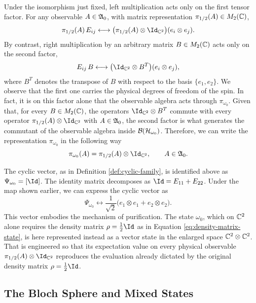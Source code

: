  	Under the isomorphism just fixed, left multiplication acts only on the first tensor factor. For any observable $A \in \mathfrak{A}_0$, with matrix representation $\pi_{1/2}(A) \in M_2(\mathbb{C})$,
 	\begin{equation}
 		\pi_{1/2}(A)\,E_{ij} \longleftrightarrow \big(\pi_{1/2}(A) \otimes \Id_{\C^2}\big)(e_i \otimes e_j).
 	\end{equation}
 	By contrast, right multiplication by an arbitrary matrix $B \in M_2(\mathbb{C})$ acts only on the second factor,
 	\begin{equation}
 		E_{ij}\,B \longleftrightarrow \big(\Id_{\C^2} \otimes B^T\big)(e_i \otimes e_j),
 	\end{equation}
 	where $B^T$ denotes the transpose of $B$ with respect to the basis $\{e_1,e_2\}$. We observe that the first one carries the physical degrees of freedom of the spin. In fact, it is on this factor alone that the observable algebra acts through $\pi_{\omega_0}$.  Given that, for every $B \in M_2(\mathbb{C})$, the operators $\Id_{\C^2} \otimes B^T$ commute with every operator $\pi_{1/2}(A) \otimes \Id_{\C^2}$ with $A \in \mathfrak{A}_0$, the second factor is what generates the commutant of the observable algebra inside $\mathcal{B}(\H_{\omega_0})$. Therefore, we can write the representation $\pi_{\omega_0}$ in the following way
 	\begin{equation}
 		\pi_{\omega_0}(A) = \pi_{1/2}(A) \otimes \Id_{\C^2}, \qquad A \in \A_0.
 	\end{equation}
 	
 	The cyclic vector, as in Definition \ref{def:cyclic-family}, is identified above as $\Psi_{\omega_0} = [\Id]$. The identity matrix decomposes as $\Id = E_{11}+E_{22}$. Under the map shown earlier, we can express the cyclic vector as
 	\begin{equation}
 		\Psi_{\omega_0} \longleftrightarrow \frac{1}{\sqrt2}\big(e_1\otimes e_1 + e_2\otimes e_2\big).
 	\end{equation}
 	This vector embodies the mechanism of purification. The state $\omega_0$, which on $\mathbb{C}^2$ alone requires the density matrix $\rho=\frac12\Id$ as in Equation \eqref{eq:density-matrix-state}, is here represented instead as a vector state in the enlarged space $\mathbb{C}^2\otimes\mathbb{C}^2$. That is engineered so that its expectation value on every physical observable $\pi_{1/2}(A)\otimes\Id_{\C^2}$ reproduces the evaluation already dictated by the original density matrix $\rho=\frac12\Id$.
	
	\subsection*{The Bloch Sphere and Mixed States}
	
